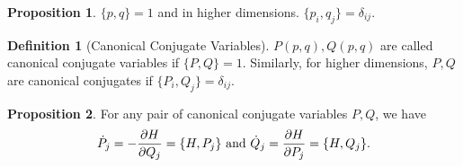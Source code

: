 \documentclass[]{article}
\theoremstyle{definition}
\theoremstyle{definition}
\newtheorem{definition}{Definition}[section]
\newtheorem{proposition}{Proposition}[section]
\begin{document}
\begin{proposition}
  \(\{p, q\} = 1\) and in higher dimensions. \(\{p_i, q_j\} = \delta_{ij}\).
\end{proposition}

\begin{definition}[Canonical Conjugate Variables]
  \(P(p, q), Q(p, q)\) are called canonical conjugate variables if \(\{P, Q\} = 1\). 
  Similarly, for higher dimensions, \(P, Q\) are canonical conjugates if 
  \(\{P_i, Q_j\} = \delta_{ij}\).
\end{definition}

\begin{proposition}
  For any pair of canonical conjugate variables \(P, Q\), we have 
  \[\dot P_j = - \pdv{H}{Q_j} = \{H, P_j\} \text{ and } 
    \dot Q_j = \pdv{H}{P_j} = \{H, Q_j\}.\]
\end{proposition}
\end{document}
